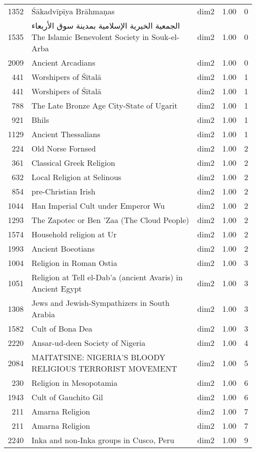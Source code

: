 \begin{tabular}{rllrr}
1352 & Śākadvīpīya Brāhmaṇas & dim2 & 1.00 & 0 \\
1535 & الجمعية الخيرية الإسلامية بمدينة سوق الأربعاء The Islamic Benevolent Society in Souk-el-Arba & dim2 & 1.00 & 0 \\
2009 & Ancient Arcadians & dim2 & 1.00 & 0 \\
441 & Worshipers of Śītalā & dim2 & 1.00 & 1 \\
441 & Worshipers of Śītalā & dim2 & 1.00 & 1 \\
788 & The Late Bronze Age City-State of Ugarit & dim2 & 1.00 & 1 \\
921 & Bhils & dim2 & 1.00 & 1 \\
1129 & Ancient Thessalians & dim2 & 1.00 & 1 \\
224 & Old Norse Fornsed & dim2 & 1.00 & 2 \\
361 & Classical Greek Religion & dim2 & 1.00 & 2 \\
632 & Local Religion at Selinous & dim2 & 1.00 & 2 \\
854 & pre-Christian Irish & dim2 & 1.00 & 2 \\
1044 & Han Imperial Cult under Emperor Wu & dim2 & 1.00 & 2 \\
1293 & The Zapotec or Ben 'Zaa (The Cloud People) & dim2 & 1.00 & 2 \\
1574 & Household religion at Ur & dim2 & 1.00 & 2 \\
1993 & Ancient Boeotians & dim2 & 1.00 & 2 \\
1004 & Religion in Roman Ostia & dim2 & 1.00 & 3 \\
1051 & Religion at Tell el-Dab'a (ancient Avaris) in Ancient Egypt & dim2 & 1.00 & 3 \\
1308 & Jews and Jewish-Sympathizers in South Arabia & dim2 & 1.00 & 3 \\
1582 & Cult of Bona Dea & dim2 & 1.00 & 3 \\
2220 & Ansar-ud-deen Society of Nigeria & dim2 & 1.00 & 4 \\
2084 & MAITATSINE: NIGERIA'S BLOODY RELIGIOUS TERRORIST MOVEMENT & dim2 & 1.00 & 5 \\
230 & Religion in Mesopotamia & dim2 & 1.00 & 6 \\
1943 & Cult of Gauchito Gil & dim2 & 1.00 & 6 \\
211 & Amarna Religion & dim2 & 1.00 & 7 \\
211 & Amarna Religion & dim2 & 1.00 & 7 \\
2240 & Inka and non-Inka groups in Cusco, Peru & dim2 & 1.00 & 9 \\

\end{tabular}
